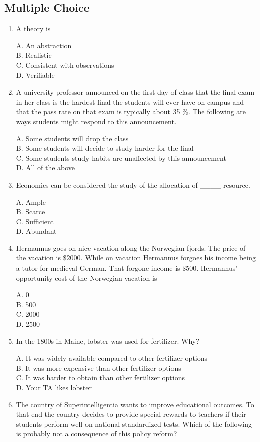 \documentclass[
]{book}
\begin{document}
\hypertarget{multiple-choice}{%
\subsection{Multiple Choice}\label{multiple-choice}}

\begin{enumerate}
\def\labelenumi{\arabic{enumi}.}
\item
  A theory is

  A. An abstraction\\
  B. Realistic\\
  C. Consistent with observations\\
  D. Verifiable
\item
  A university professor announced on the first day of class that the final exam in her class is the hardest final the students will ever have on campus and that the pass rate on that exam is typically about 35 \%. The following are ways students might respond to this announcement.

  A. Some students will drop the class\\
  B. Some students will decide to study harder for the final\\
  C. Some students study habits are unaffected by this announcement\\
  D. All of the above
\item
  Economics can be considered the study of the allocation of \_\_\_\_ resource.

  A. Ample\\
  B. Scarce\\
  C. Sufficient\\
  D. Abundant
\item
  Hermannus goes on nice vacation along the Norwegian fjords. The price of the vacation is \(\$2000\). While on vacation Hermannus forgoes his income being a tutor for medieval German. That forgone income is \(\$500\). Hermannus' opportunity cost of the Norwegian vacation is

  A. 0\\
  B. 500\\
  C. 2000\\
  D. 2500
\item
  In the 1800s in Maine, lobster was used for fertilizer. Why?

  A. It was widely available compared to other fertilizer options\\
  B. It was more expensive than other fertilizer options\\
  C. It was harder to obtain than other fertilizer options\\
  D. Your TA likes lobster
\item
  The country of Superintelligentia wants to improve educational outcomes. To that end the country decides to provide special rewards to teachers if their students perform well on national standardized tests. Which of the following is probably not a consequence of this policy reform?


\end{enumerate}
\end{document}
